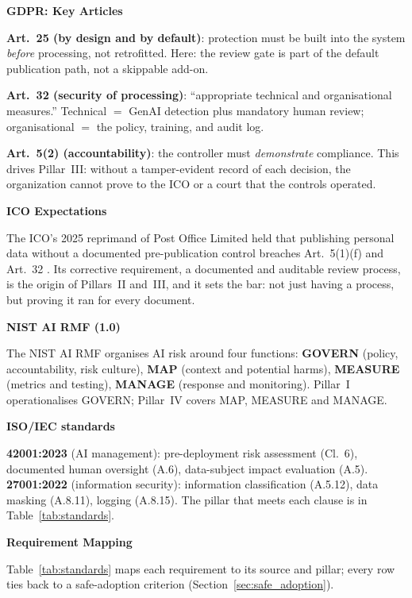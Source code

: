 \documentclass[12pt,a4paper]{article}
\begin{document}
\noindent\textbf{GDPR: Key Articles}~\cite{gdpr}\par

\textbf{Art.~25 (by design and by default)}: protection must be built into the system \emph{before} processing, not retrofitted. Here: the review gate is part of the default publication path, not a skippable add-on.

\textbf{Art.~32 (security of processing)}: ``appropriate technical and organisational measures.'' Technical $=$ GenAI detection plus mandatory human review; organisational $=$ the policy, training, and audit log.

\textbf{Art.~5(2) (accountability)}: the controller must \emph{demonstrate} compliance. This drives Pillar~III: without a tamper-evident record of each decision, the organization cannot prove to the ICO or a court that the controls operated.

\noindent\textbf{ICO Expectations}\par

The ICO's 2025 reprimand of Post Office Limited held that publishing personal data without a documented pre-publication control breaches Art.~5(1)(f) and Art.~32 \cite{ico2025}. Its corrective requirement, a documented and auditable review process, is the origin of Pillars~II and~III, and it sets the bar: not just having a process, but proving it ran for every document.

\noindent\textbf{NIST AI RMF (1.0)}\par
The NIST AI RMF \cite{nist_ai_rmf} organises AI risk around four functions: \textbf{GOVERN} (policy, accountability, risk culture), \textbf{MAP} (context and potential harms), \textbf{MEASURE} (metrics and testing), \textbf{MANAGE} (response and monitoring). Pillar~I operationalises GOVERN; Pillar~IV covers MAP, MEASURE and MANAGE.

\noindent\textbf{ISO/IEC standards}\par
\textbf{42001:2023} \cite{iso42001} (AI management): pre-deployment risk assessment (Cl.~6), documented human oversight (A.6), data-subject impact evaluation (A.5). \textbf{27001:2022} \cite{iso27001} (information security): information classification (A.5.12), data masking (A.8.11), logging (A.8.15). The pillar that meets each clause is in Table~\ref{tab:standards}.

\noindent\textbf{Requirement Mapping}\par

Table~\ref{tab:standards} maps each requirement to its source and pillar; every row ties back to a safe-adoption criterion (Section~\ref{sec:safe_adoption}).
\end{document}

